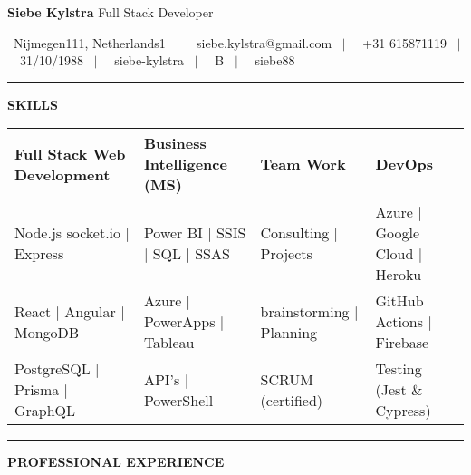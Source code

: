 \documentclass[11pt,a4paper]{article}
\begin{document}
\begin{center}
{\Large \textbf{Siebe Kylstra} Full Stack Developer}

\vspace{0.3cm}

{\small \faMapMarker \ Nijmegen111, Netherlands1 \ $|$ \ \faEnvelope \ siebe.kylstra@gmail.com \ $|$ \ \faPhone \ +31 615871119 \ $|$ \ \faCalendar \ 31/10/1988 \ $|$ \ \faLinkedin \ siebe-kylstra \ $|$ \ \faCar \ B \ $|$ \ \faGithub \ siebe88}

\end{center}

\vspace{0.5cm}
\rule{\textwidth}{0.5pt}
\vspace{0.5cm}

\begin{center}
\textbf{SKILLS}
\end{center}

\vspace{0.3cm}

\begin{center}
\begin{tabular}{p{}p{}p{}p{}}
\textbf{Full Stack Web Development} & \textbf{Business Intelligence (MS)} & \textbf{Team Work} & \textbf{DevOps} \\
\midrule
Node.js socket.io $|$ Express & Power BI $|$ SSIS $|$ SQL $|$ SSAS & Consulting $|$ Projects & Azure $|$ Google Cloud $|$ Heroku \\
React $|$ Angular $|$ MongoDB & Azure $|$ PowerApps $|$ Tableau & brainstorming $|$ Planning & GitHub Actions $|$ Firebase \\
PostgreSQL $|$ Prisma $|$ GraphQL & API's $|$ PowerShell & SCRUM (certified) & Testing (Jest \& Cypress)
\end{tabular}
\end{center}

\vspace{0.5cm}
\rule{\textwidth}{0.5pt}
\vspace{0.5cm}

\begin{center}
\textbf{PROFESSIONAL EXPERIENCE}
\end{center}

\vspace{0.3cm}
\end{document}
